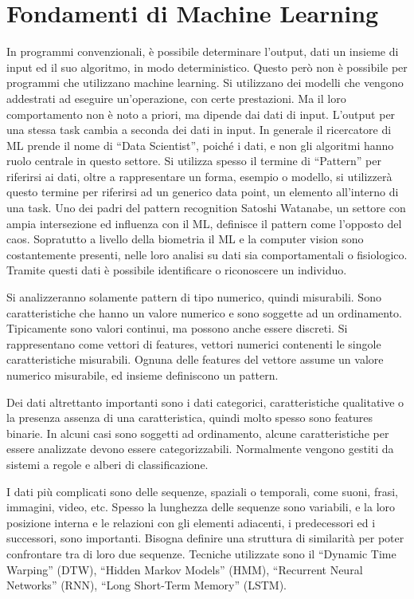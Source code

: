 \documentclass{article}
\numberwithin{equation}{subsection}
\begin{document}
\clearpage

\section{Fondamenti di Machine Learning}

In programmi convenzionali, è possibile determinare l'output, dati un insieme di input ed il 
suo algoritmo, in modo deterministico. Questo però non è possibile per programmi che utilizzano 
machine learning. Si utilizzano dei modelli che vengono addestrati ad eseguire un'operazione, con certe prestazioni. Ma il loro comportamento non è noto a priori, ma dipende dai dati di input. L'output per una stessa task cambia a seconda dei dati in input. 
In generale il ricercatore di ML prende il nome di ``Data Scientist'', poiché i dati, e non 
gli algoritmi hanno ruolo centrale in questo settore. 
Si utilizza spesso il termine di ``Pattern'' per riferirsi ai dati, oltre a rappresentare 
un forma, esempio o modello, si utilizzerà questo termine per riferirsi ad un generico 
data point, un elemento all'interno di una task. 
Uno dei padri del pattern recognition Satoshi Watanabe, un settore con ampia intersezione ed influenza con il ML, definisce il pattern come l'opposto del caos. 
Sopratutto a livello della biometria il ML e la computer vision sono costantemente presenti, 
nelle loro analisi su dati sia comportamentali o fisiologico. Tramite questi dati è 
possibile identificare o riconoscere un individuo. 

Si analizzeranno solamente pattern di tipo numerico, quindi misurabili. Sono caratteristiche 
che hanno un valore numerico e sono soggette ad un ordinamento. Tipicamente sono valori continui, ma possono anche essere discreti. Si rappresentano come vettori di features, vettori numerici contenenti le singole caratteristiche misurabili. Ognuna delle features del vettore assume un valore numerico misurabile, ed insieme definiscono un pattern. 

Dei dati altrettanto importanti sono i dati categorici, caratteristiche qualitative o 
la presenza assenza di una caratteristica, quindi molto spesso sono features binarie. In 
alcuni casi sono soggetti ad ordinamento, alcune caratteristiche per essere analizzate devono essere categorizzabili. Normalmente vengono gestiti da sistemi a regole e alberi di 
classificazione. 

I dati più complicati sono delle sequenze, spaziali o temporali, come suoni, frasi, immagini, video, etc. Spesso la lunghezza delle sequenze sono variabili, e la loro posizione 
interna e le relazioni con gli elementi adiacenti, i predecessori ed i successori, sono importanti. 
Bisogna definire una struttura di similarità per poter confrontare tra di loro due sequenze. Tecniche utilizzate sono il ``Dynamic Time Warping'' (DTW), ``Hidden Markov Models'' (HMM), 
``Recurrent Neural Networks'' (RNN), ``Long Short-Term Memory'' (LSTM). 
\end{document}
